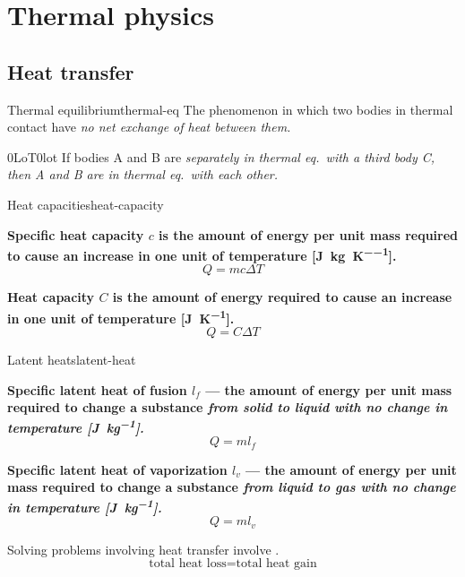 \chapter{Thermal physics}
\section{Heat transfer}
\begin{definition}{Thermal equilibrium}{thermal-eq}
	The phenomenon in which two bodies in thermal contact
	have \it{no net exchange of heat} between them.
\end{definition}
\begin{definition}{0LoT}{0lot}
	If bodies A and B are \it{separately in thermal eq.}~with a third body
	C, then A and B are in thermal eq.~with each other.
\end{definition}
\begin{definition}{Heat capacities}{heat-capacity}
	\par
	\bf{Specific heat capacity} \(c\) is the amount of energy
	per unit mass required to cause an increase in one unit of temperature [\unit{\joule\per\kilogram\per\kelvin}].
	\[Q=mc\Delta T\]

	\bf{Heat capacity} \(C\) is the amount of energy
	required to cause an increase in one unit of temperature [\unit{\joule\per\kelvin}].
	\[Q=C\Delta T\]
\end{definition}
\begin{definition}{Latent heats}{latent-heat}
	\par
	\bf{Specific latent heat of fusion} \(l_f\) --- the amount of energy
	per unit mass required to change a substance \it{from solid to liquid} with no change in temperature [\unit{\joule\per\kilogram}].
	\[Q=ml_f\]

	\bf{Specific latent heat of vaporization} \(l_v\) --- the amount of energy
	per unit mass required to change a substance \it{from liquid to gas} with no change in temperature [\unit{\joule\per\kilogram}].
	\[Q=ml_v\]
\end{definition}

Solving problems involving heat transfer involve .
\[\text{total heat loss} = \text{total heat gain}\]

